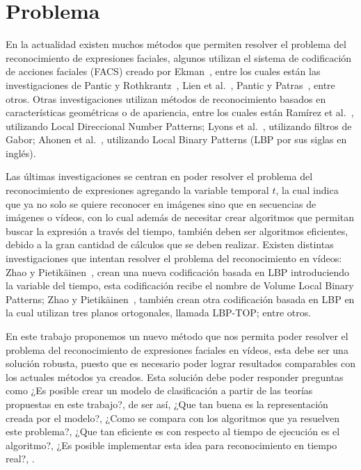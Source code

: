 \section{Problema}
\label{sec:problema}

En la actualidad existen muchos métodos que permiten resolver el problema del reconocimiento de expresiones faciales, algunos utilizan el sistema de codificación de acciones faciales (FACS) creado por Ekman~\cite{Ekman1978}, entre los cuales están las investigaciones de Pantic y Rothkrantz~\cite{Pantic2004}, Lien et al.~\cite{Lien1998}, Pantic y Patras~\cite{Pantic2006}, entre otros. Otras investigaciones utilizan métodos de reconocimiento basados en características geométricas o de apariencia, entre los cuales están Ramírez et al.~\cite{RamirezRivera2013}, utilizando Local Direccional Number Patterns; Lyons et al.~\cite{Lyons1998}, utilizando filtros de Gabor; Ahonen et al.~\cite{Ahonen2006}, utilizando Local Binary Patterns (LBP por sus siglas en inglés).

Las últimas investigaciones se centran en poder resolver el problema del reconocimiento de expresiones agregando la variable temporal $t$, la cual indica que ya no solo se quiere reconocer en imágenes sino que en secuencias de imágenes o vídeos, con lo cual además de necesitar crear algoritmos que permitan buscar la expresión a través del tiempo, también deben ser algoritmos eficientes, debido a la gran cantidad de cálculos que se deben realizar. Existen distintas investigaciones que intentan resolver el problema del reconocimiento en vídeos: Zhao y Pietikäinen~\cite{Zhao2006}, crean una nueva codificación basada en LBP introduciendo la variable del tiempo, esta codificación recibe el nombre de Volume Local Binary Patterns; Zhao y Pietikäinen~\cite{Zhao2006}, también crean otra codificación basada en LBP en la cual utilizan tres planos ortogonales, llamada LBP-TOP; entre otros.

En este trabajo proponemos un nuevo método que nos permita poder resolver el problema del reconocimiento de expresiones faciales en vídeos, esta debe ser una solución robusta, puesto que es necesario poder lograr resultados comparables con los actuales métodos ya creados. Esta solución debe poder responder preguntas como ¿Es posible crear un modelo de clasificación a partir de las teorías propuestas en este trabajo?, de ser así, ¿Que tan buena es la representación creada por el modelo?, ¿Como se compara con los algoritmos que ya resuelven este problema?, ¿Que tan eficiente es con respecto al tiempo de ejecución es el algoritmo?, ¿Es posible implementar esta idea para reconocimiento en tiempo real?, \etc.



